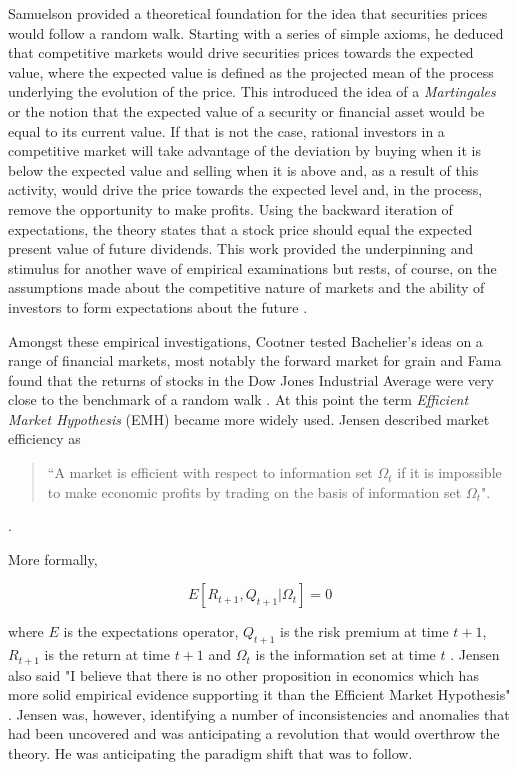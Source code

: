 \documentclass[12pt, a4paper, oneside]{article} %
\begin{document}
Samuelson provided a theoretical foundation for the idea that securities prices would follow a random walk.  Starting with a series of simple axioms, he deduced that competitive markets would drive securities prices towards the expected value, where the expected value is defined as the projected mean of the process underlying the evolution of the price.  This introduced the idea of a \emph{Martingales} or the notion that the expected value of a security or financial asset would be equal to its current value.  If that is not the case, rational investors in a competitive market will take advantage of the deviation by buying when it is below the expected value and selling when it is above and, as a result of this activity, would drive the price towards the expected level and, in the process, remove the opportunity to make profits.   Using the backward iteration of expectations, the theory states that a stock price should equal the expected present value of future dividends. This work provided the underpinning and stimulus for another wave of empirical examinations but rests, of course, on the assumptions made about the competitive nature of markets and the ability of investors to form expectations about the future \citep{SamuelsonStockPrices}.  

Amongst these empirical investigations, Cootner tested Bachelier's ideas on a range of financial markets, most notably the forward market for grain \citep{CootnerSpeculators} and  Fama found that the returns of stocks in the Dow Jones Industrial Average were very close to the benchmark of a random walk \citep{FamaStock}.  At this point the term \emph{Efficient Market Hypothesis} (EMH) became more widely used.  Jensen described market efficiency as 

\begin{quotation}
``A market is efficient with respect to information set $\Omega_t$ if it is impossible to make economic profits by trading on the basis of information set $\Omega_t$".  
\end{quotation}
\citep[p. 95]{JensenEfficiency}. 

More formally, 

\begin{equation}
E[R_{t+1}, Q_{t+1} | \Omega_t] = 0
\end{equation}

where $E$ is the expectations operator, $Q_{t+1}$ is the risk premium at time $t+1$, $R_{t+1}$ is the return at time $t +1$ and $\Omega_t$ is the information set at time $t$ \citep[p. 95]{JensenEfficiency}.  Jensen also said "I believe that there is no other proposition in economics which has more solid empirical evidence supporting it than the Efficient Market Hypothesis" \citep[p. 93]{JensenEfficiency}.   Jensen was, however, identifying a number of inconsistencies and anomalies that had been uncovered and was anticipating a revolution that would overthrow the theory.  He was anticipating the paradigm shift that was to follow.  
\end{document}
